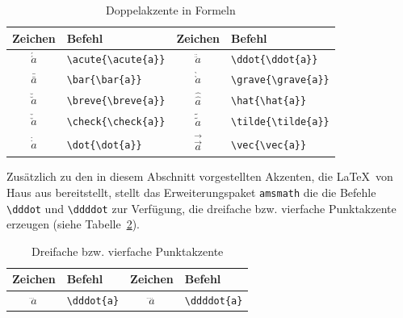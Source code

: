 \documentclass[a4paper,10pt,twoside]{scrbook}
\begin{document}
{\begin{table}[h!tb]
\centering
\caption{Doppelakzente in Formeln}
\label{Tabelle_Doppelakzente_Formeln}       %
\begin{tabular}{clcl}
\hline
Zeichen & Befehl & Zeichen & Befehl  \\
\hline
$\acute{\acute{a}}$ & \texttt{\textbackslash acute\{\textbackslash acute\{a\}\}} & 
$\ddot{\ddot{a}}$ & \texttt{\textbackslash ddot\{\textbackslash ddot\{a\}\}} \\
$\bar{\bar{a}}$ & \texttt{\textbackslash bar\{\textbackslash bar\{a\}\}} &
$\grave{\grave {a}}$ & \texttt{\textbackslash grave\{\textbackslash grave\{a\}\}} \\
$\breve{\breve {a}}$ & \texttt{\textbackslash breve\{\textbackslash breve\{a\}\}} &
$\hat{\hat {a}}$ & \texttt{\textbackslash hat\{\textbackslash hat\{a\}\}} \\
$\check{\check {a}}$ & \texttt{\textbackslash check\{\textbackslash check\{a\}\}} &
$\tilde{\tilde {a}}$ & \texttt{\textbackslash tilde\{\textbackslash tilde\{a\}\}} \\
$\dot{\dot {a}}$ & \texttt{\textbackslash dot\{\textbackslash dot\{a\}\}} &
$\vec{\vec {a}}$ & \texttt{\textbackslash vec\{\textbackslash vec\{a\}\}} \\
\hline
\end{tabular}
\end{table}

Zusätzlich zu den in diesem Abschnitt 
vorgestellten Akzenten, die \LaTeX\ von
Haus aus bereitstellt, stellt das Erweiterungspaket \verb!amsmath! 
die die Befehle \verb!\dddot! 
und \verb!\ddddot! zur Verfügung, die 
dreifache bzw. vierfache Punktakzente erzeugen (siehe Tabelle~\ref{Tabelle_Akzente_amsmath}). 


\begin{table}[h!tb]
\centering
\caption{Dreifache bzw. vierfache Punktakzente}
\label{Tabelle_Akzente_amsmath}       %
\begin{tabular}{clcl}
\hline
Zeichen & Befehl & Zeichen & Befehl  \\
\hline
$\dddot{a}$ & \texttt{\textbackslash dddot\{a\}} & 
$\ddddot{a}$ & \texttt{\textbackslash ddddot\{a\}} \\
\hline
\end{tabular}
\end{table}

}
\end{document}
